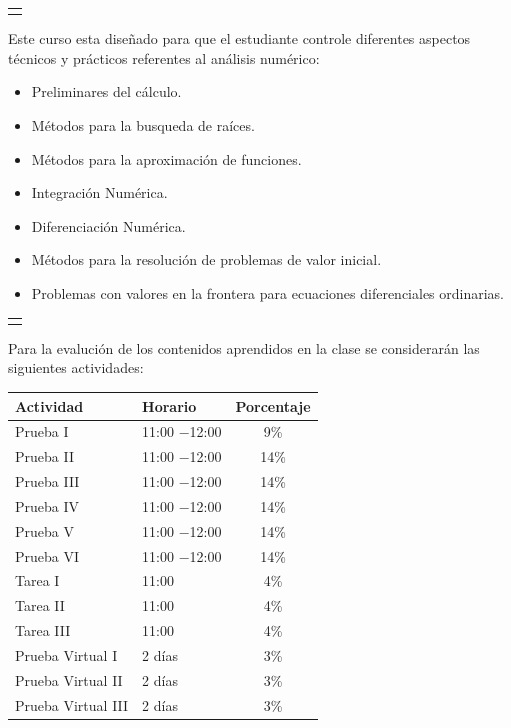 \documentclass[11.9pt,letterpaper]{article}
\begin{document}
\begin{multicols}{2}
\begin{center}
\begin{tabular}{c}
\cellcolor{gray!40}{CONTENIDOS}
\end{tabular}
\end{center}
\hspace*{0.5cm} Este curso esta diseñado para que el estudiante controle diferentes aspectos técnicos y prácticos referentes al análisis numérico:
\begin{itemize}
\item Preliminares del cálculo.
\item Métodos para la busqueda de raíces.
\item Métodos para la aproximación de funciones.
\item Integración Numérica.
\item Diferenciación Numérica.
\item Métodos para la resolución de problemas de valor inicial. 
\item Problemas con valores en la frontera para ecuaciones diferenciales ordinarias.
\end{itemize} 
\begin{center}
\begin{tabular}{c}
\cellcolor{gray!40}{EVALUACIÓN}
\end{tabular}
\end{center}
\vspace*{0.5cm} Para la evalución de los contenidos aprendidos en la clase se considerarán las siguientes actividades:
\begin{table}[H]
\centering
\begin{tabular}{|l|l|c|}
\hline
Actividad  & Horario & Porcentaje\\\hline\hline
Prueba I&11:00 $-$12:00 &9\%\\
Prueba II&11:00 $-$12:00 &14\%\\
Prueba III&11:00 $-$12:00 &14\%\\
Prueba IV&11:00 $-$12:00 &14\%\\
Prueba V&11:00 $-$12:00 &14\%\\
Prueba VI&11:00 $-$12:00 &14\%\\
Tarea I&11:00 &4\%\\
Tarea II&11:00 &4\%\\
Tarea III&11:00 &4\%\\
Prueba Virtual I &2 días &3\%\\
Prueba Virtual II &2 días &3\%\\
Prueba Virtual III &2 días&3\%\\\hline

\end{tabular}
\end{table}
\end{multicols}
\end{document}
